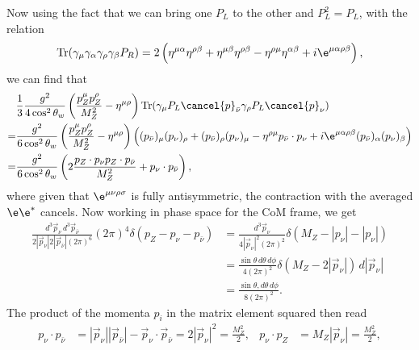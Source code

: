 \documentclass[a4paper, 11pt, normalem]{report}
\begin{document}
Now using the fact that we can bring one $P_L$ to the other and $P_L^2=P_L$, with the relation
\begin{align}
    \text{Tr}(\gamma_\mu\gamma_\alpha\gamma_\rho\gamma_\beta P_R) = 2\left(\eta^{\mu\alpha}\eta^{\rho\beta}+\eta^{\mu\beta}\eta^{\rho\beta}-\eta^{\rho\mu}\eta^{\alpha\beta}+i\e^{\mu\alpha\rho\beta}\right),
\end{align}
we can find that
\begin{align}
    \begin{split}
        &\frac13 \frac{g^2}{4\cos^2\theta_w}\left(\frac{p_Z^\mu p_Z^\rho}{M_Z^2}-\eta^{\mu\rho}\right)\text{Tr}(\gamma_\mu P_L\cancel{p}_{\bar{\nu}}\gamma_\rho P_L\cancel{p}_\nu) \\
        =&\frac{g^2}{6\cos^2\theta_w}\left(\frac{p_Z^\mu p_Z^\rho}{M_Z^2}-\eta^{\mu\rho}\right)\left((p_{\bar{\nu}})_\mu(p_\nu)_\rho + (p_{\bar{\nu}})_\rho(p_\nu)_\mu - \eta^{\rho\mu}p_{\bar{\nu}}\cdot p_\nu + i\e^{\mu\alpha\rho\beta}(p_{\bar{\nu}})_\alpha(p_\nu)_\beta\right) \\
        =&\frac{g^2}{6\cos^2\theta_w}\left(2\frac{p_Z\cdot p_\nu p_Z\cdot p_{\bar{\nu}}}{M_Z^2} + p_\nu\cdot p_{\bar{\nu}}\right),
    \end{split}
\end{align}
where given that $\e^{\mu\nu\rho\sigma}$ is fully antisymmetric, the contraction with the averaged $\e\e^*$ cancels.
Now working in phase space for the CoM frame, we get
\begin{align}
    \frac{d^3\vec{p}_\nu\,d^3\vec{p}_{\bar{\nu}}}{2|\vec{p}_\nu|2|\vec{p}_{\bar{\nu}}|(2\pi)^6} (2\pi)^4\delta(p_Z-p_\nu-p_{\bar{\nu}}) &= \frac{d^3\vec{p}_\nu}{4|\vec{p}_\nu|^2(2\pi)^2}\delta(M_Z-|p_\nu|-|p_\nu|) \\
                                                                                                                                        &= \frac{\sin\theta\,d\theta\,d\phi}{4(2\pi)^2}\delta(M_Z-2|\vec{p}_\nu|)\,d|\vec{p}_\nu|\\
                                                                                                                                        &= \frac{\sin\theta,d\theta\,d\phi}{8(2\pi)^2}.
\end{align}
The product of the momenta $p_i$ in the matrix element squared then read
\begin{align}
    p_\nu\cdot p_{\bar{\nu}} &= |\vec{p}_\nu||\vec{p}_{\bar{\nu}}| - \vec{p}_\nu\cdot \vec{p}_{\bar{\nu}} = 2|\vec{p}_\nu|^2 = \frac{M_Z^2}{2}, & p_\nu\cdot p_Z &= M_Z|\vec{p}_\nu| = \frac{M_Z^2}{2},
\end{align}
\end{document}
